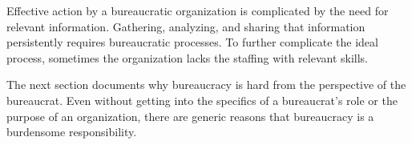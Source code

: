 

Effective action by a bureaucratic organization is complicated by the need for relevant information. Gathering, analyzing, and sharing that information persistently requires bureaucratic processes. To further complicate the ideal process, sometimes the organization lacks the staffing with relevant skills. 


The next section documents why bureaucracy is hard from the perspective of the bureaucrat. Even without getting into the specifics of a bureaucrat's role or the purpose of an organization, there are generic reasons that bureaucracy is a burdensome responsibility.